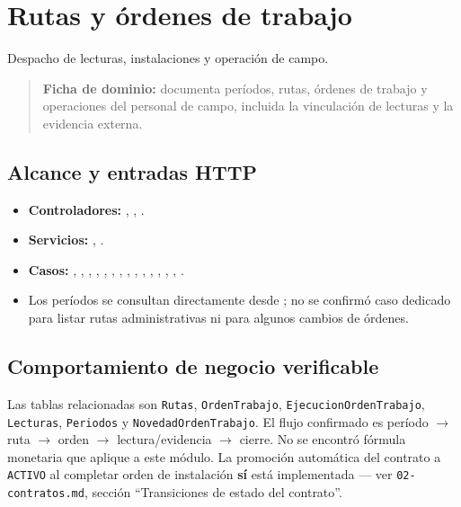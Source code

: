 \section{Rutas y órdenes de trabajo}


Despacho de lecturas, instalaciones y operación de campo.


\begin{quote}
\textbf{Ficha de dominio:} documenta períodos, rutas, órdenes de trabajo y operaciones del personal de campo, incluida la vinculación de lecturas y la evidencia externa.
\end{quote}


\subsection{Alcance y entradas HTTP}


\begin{itemize}
\item \textbf{Controladores:} \texttt{}, \texttt{}, \texttt{}.
\item \textbf{Servicios:} \texttt{}, \texttt{}.
\item \textbf{Casos:} \texttt{}, \texttt{}, \texttt{}, \texttt{}, \texttt{}, \texttt{}, \texttt{}, \texttt{}, \texttt{}, \texttt{}, \texttt{}, \texttt{}, \texttt{}, \texttt{}, \texttt{}.
\item Los períodos se consultan directamente desde \texttt{}; no se confirmó caso dedicado para listar rutas administrativas ni para algunos cambios de órdenes.
\end{itemize}

\subsection{Comportamiento de negocio verificable}
Las tablas relacionadas son \texttt{Rutas}, \texttt{OrdenTrabajo}, \texttt{EjecucionOrdenTrabajo}, \texttt{Lecturas}, \texttt{Periodos} y \texttt{NovedadOrdenTrabajo}. El flujo confirmado es período $\rightarrow$ ruta $\rightarrow$ orden $\rightarrow$ lectura/evidencia $\rightarrow$ cierre. No se encontró fórmula monetaria que aplique a este módulo. La promoción automática del contrato a \texttt{ACTIVO} al completar orden de instalación \textbf{sí} está implementada --- ver \texttt{02-contratos.md}, sección ``Transiciones de estado del contrato''.


